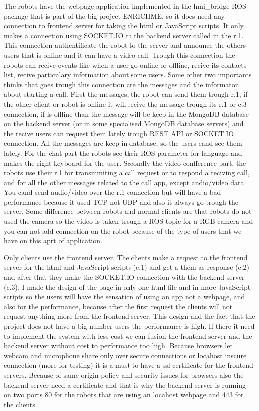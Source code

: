 The robots have the webpage application implemented in the hmi_bridge ROS package that is part of
the big project ENRICHME, so it does need any connection to frontend server for taking the html or
JavaScript scripts. It only makes a connection using SOCKET.IO to the backend server called in the 
 r.1. This connection authentificate the robot to the
server and announce the others users that is online and it can have a video call. Trough this connection
the robots can recive events like when a user go online or offline, recive its contacts list, recive
particulary information about some users. Some other two importants thinks that goes trough this connection
are the messages and the informaton about starting a call. First the messages, the robot can send them trough
r.1, if the other client or robot is online it will recive the message trough its r.1 or c.3 connection, if is
offline than the message will be keep in the MongoDB database on the backend server (or in some specialised MongoDB
database servers) and the recive users can request them lately trough REST API or SOCKET.IO connection. All the messages
are keep in database, so the users cand see them lately. For the chat part the robots see their ROS parameter for language
and makes the right keyboard for the user. Secondly the video-confference part, the robots use their r.1 for transmmiting 
a call request or to respond a reciving call, and for all the other messages related to the call app, except
audio/video data. You cand send audio/video over the r.1 connection but will have a bad performance because it
used TCP not UDP and also it always go trough the server. Some difference between robots and normal clients are
that robots do not used the camera so the video is taken trough a ROS topic for a RGB camera and you can not add
connection on the robot because of the type of users that we have on this aprt of application.

Only clients use the frontend server. The clients make
a request to the frontend server for the html and JavaScript scripts (c.1) and get a them as
response (c.2) and after that they make the SOCKET.IO connection with the backend server (c.3).
I made the design of the page in only one html file and in more JavaScript scripts so the users
will have the sensation of using an app not a webpage, and also for the performance, because after
the first request the clients will not request anything more from the frontend server. This design and
the fact that the project does not have a big number users the performance is high. If there it need to
implement the system with less cost we can fusion the frontend server and the backend server without 
cost to performance too high. Because browsers let webcam and microphone share only over secure connections
or locahost inscure connection (more for testing) it is a must to have a ssl certificate for the
frontend servers. Because of same origin policy and security issues for browsers also the backend
server need a certificate and that is why the backend server is running on two ports 80 for the robots
that are using an locahost webpage and 443 for the clients.


